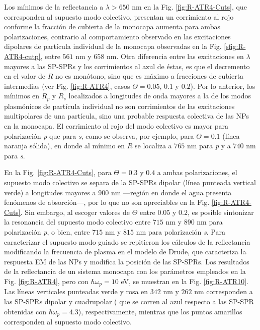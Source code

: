 Los mínimos de la reflectancia a $\lambda>650$ nm en la Fig. \ref{fig:R-ATR4-Cuts}, que corresponden al supuesto modo colectivo, presentan un corrimiento al rojo conforme la fracción de cubierta de la monocapa aumenta  para ambas polarizaciones, contrario al comportamiento observado en las excitaciones dipolares de partícula individual de la monocapa observadas en la Fig. \ref{sfig:R-ATR4-cutp}, entre $561$ nm y $658$ nm. Otra diferencia entre las excitaciones en $\lambda$ mayores a las SP-SPRs y los corrimientos al azul de éstas, es que el decremento en el valor de $R$ no es monótono, sino que es máximo a fracciones de cubierta intermedias (ver Fig. \ref{fig:R-ATR4}, casos $\Theta=0.05$, $0.1$ y $0.2$). Por lo anterior, los mínimos en $R_p$ y $R_s$ localizados a longitudes de onda mayores a la de los modos plasmónicos de partícula individual no son corrimientos de las excitaciones multipolares de una partícula, sino una probable respuesta colectiva de las NPs en la monocapa. El corrimiento al rojo del modo colectivo es mayor para  polarización \emph{p} que para \emph{s}, como se observa, por ejemplo, para $\Theta=0.1$ (línea naranja sólida), en donde al mínimo en $R$ se localiza a $765$ nm para \emph{p} y  a $740$ nm para \emph{s}.

En la Fig. \ref{fig:R-ATR4-Cuts}, para $\Theta = 0.3$ y $0.4$ a ambas polarizaciones, el supuesto modo colectivo se separa de la SP-SPRs dipolar (línea punteada vertical verde) a longitudes mayores a $900$ nm ---región en donde el agua presenta fenómenos de absorción---, por lo que 
no son apreciables en la Fig. \ref{fig:R-ATR4-Cuts}. Sin embargo, al escoger valores de $\Theta$ entre $0.05$ y $0.2$, es posible sintonizar la resonancia del supuesto modo colectivo entre $715$ nm y $890$ nm para polarización \emph{p}, o bien, entre $715$ nm y $815$ nm para polarización \emph{s}. Para caracterizar el supuesto modo guiado se repitieron los cálculos de la reflectancia modificando la frecuencia de plasma en el modelo de Drude, que caracteriza la respuesta EM de las NPs y modifica la posición de las SP-SPRs. Los resultados de la reflectancia de un sistema monocapa con los parámetros empleados en la Fig. \ref{fig:R-ATR4}, pero con $\hbar\omega_p = 10$ eV, se muestran en la Fig. \ref{fig:R-ATR10}. Las líneas verticales punteadas verde y rosa en $342$ nm y $262$ nm corresponden a las SP-SPRs dipolar y cuadrupolar ( que se corren al azul respecto a las SP-SPR obtenidas con $\hbar\omega_p=4.3$), respectivamente, mientras que los puntos amarillos corresponden al supuesto modo colectivo.
				
